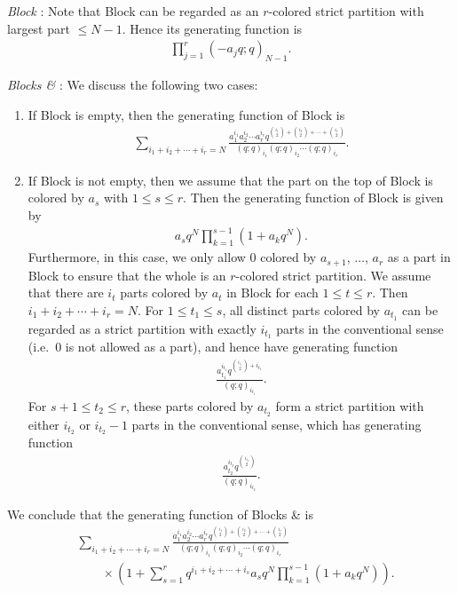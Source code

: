 \documentclass[12pt,reqno]{amsart}
\numberwithin{equation}{section}
\theoremstyle{plain}
\theoremstyle{definition}
\newcommand{\bl}[1]{\uppercase\expandafter{\romannumeral#1}}
\begin{document}
\emph{Block \uppercase\expandafter{}}: Note that Block \uppercase\expandafter{} can be regarded as an $r$-colored strict partition with largest part $\le N-1$. Hence its generating function is
\begin{align}
\label{cd2}
\prod_{j=1}^{r}(-a_{j}q;q)_{N-1}.
\end{align}

\emph{Blocks \uppercase\expandafter{} \& \uppercase\expandafter{}}: We discuss the following two cases:
\begin{enumerate}[\indent 1).]
\item If Block \bl{3} is empty, then the generating function of Block \bl{2} is
\begin{align*}
\sum_{i_{1}+i_{2}+\cdots+i_{r}=N}\frac{a_{1}^{i_{1}}a_{2}^{i_{2}}\cdots a_{r}^{i_{r}}q^{\binom{i_1}{2}+\binom{i_2}{2}+\cdots+\binom{i_r}{2}}}{(q;q)_{i_{1}}(q;q)_{i_{2}}\cdots(q;q)_{i_{r}}}.
\end{align*}
\item If Block \bl{3} is not empty, then we assume that the part on the top of Block \bl{3} is colored by $a_s$ with $1\le s\le r$. Then the generating function of Block \bl{3} is given by
\begin{align*}
a_s q^N \prod_{k=1}^{s-1} \left(1+a_k q^N\right).
\end{align*}
Furthermore, in this case, we only allow $0$ colored by $a_{s+1}$, $\ldots$, $a_r$ as a part in Block \bl{2} to ensure that the whole is an $r$-colored strict partition. We assume that there are $i_t$ parts colored by $a_t$ in Block \bl{2} for each $1\le t\le r$. Then $i_{1}+i_{2}+\cdots+i_{r}=N$. For $1\le t_1\le s$, all distinct parts colored by $a_{t_1}$ can be regarded as a strict partition with exactly $i_{t_1}$ parts in the conventional sense (i.e.~$0$ is not allowed as a part), and hence have generating function
\begin{align*}
\frac{a_{t_1}^{i_{t_1}}q^{\binom{i_{t_1}}{2}+i_{t_1}}}{(q;q)_{i_{t_1}}}.
\end{align*}
For $s+1\le t_2\le r$, these parts colored by $a_{t_2}$ form a strict partition with either $i_{t_2}$ or $i_{t_2}-1$ parts in the conventional sense, which has generating function
\begin{align*}
\frac{a_{t_2}^{i_{t_2}}q^{\binom{i_{t_2}}{2}}}{(q;q)_{i_{t_2}}}.
\end{align*}
\end{enumerate}
We conclude that the generating function of Blocks \bl{2} \& \bl{3} is
\begin{align}
&\sum_{i_{1}+i_{2}+\cdots+i_{r}=N}\frac{a_{1}^{i_{1}}a_{2}^{i_{2}}\cdots a_{r}^{i_{r}}q^{\binom{i_1}{2}+\binom{i_2}{2}+\cdots+\binom{i_r}{2}}}{(q;q)_{i_{1}}(q;q)_{i_{2}}\cdots(q;q)_{i_{r}}}\nonumber\\
&\quad\quad\times \left(1+\sum_{s=1}^{r}q^{i_1+i_2+\cdots+i_s}a_s q^N \prod_{k=1}^{s-1}\left(1+a_k q^N\right)\right).
\end{align}
\end{document}
